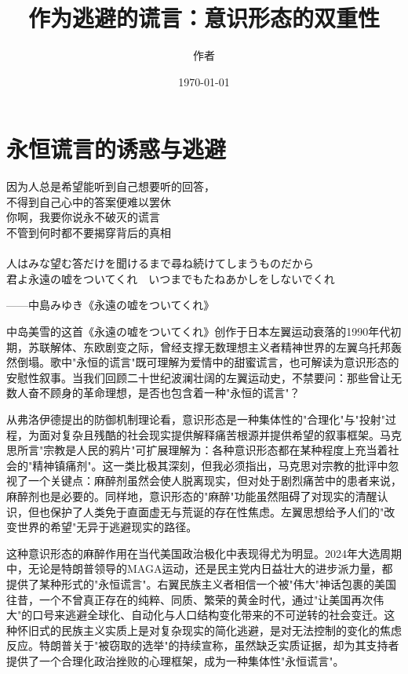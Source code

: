 \documentclass{article}
\title{作为逃避的谎言：意识形态的双重性}
\author{作者}
\date{\today}
\begin{document}
\maketitle

\section{永恒谎言的诱惑与逃避}

\epigraph{因为人总是希望能听到自己想要听的回答，\\
不得到自己心中的答案便难以罢休\\
你啊，我要你说永不破灭的谎言\\
不管到何时都不要揭穿背后的真相\\
\\
人はみな望む答だけを聞けるまで尋ね続けてしまうものだから\\
君よ永遠の嘘をついてくれ　いつまでもたねあかしをしないでくれ}{——中島みゆき《永遠の嘘をついてくれ》}

中岛美雪的这首《永遠の嘘をついてくれ》创作于日本左翼运动衰落的1990年代初期，苏联解体、东欧剧变之际，曾经支撑无数理想主义者精神世界的左翼乌托邦轰然倒塌。歌中"永恒的谎言"既可理解为爱情中的甜蜜谎言，也可解读为意识形态的安慰性叙事。当我们回顾二十世纪波澜壮阔的左翼运动史，不禁要问：那些曾让无数人奋不顾身的革命理想，是否也包含着一种"永恒的谎言"？

从弗洛伊德提出的防御机制理论看，意识形态是一种集体性的"合理化"与"投射"过程，为面对复杂且残酷的社会现实提供解释痛苦根源并提供希望的叙事框架。马克思所言"宗教是人民的鸦片"可扩展理解为：各种意识形态都在某种程度上充当着社会的"精神镇痛剂"。这一类比极其深刻，但我必须指出，马克思对宗教的批评中忽视了一个关键点：麻醉剂虽然会使人脱离现实，但对处于剧烈痛苦中的患者来说，麻醉剂也是必要的。同样地，意识形态的"麻醉"功能虽然阻碍了对现实的清醒认识，但也保护了人类免于直面虚无与荒诞的存在性焦虑。左翼思想给予人们的"改变世界的希望"无异于逃避现实的路径。

这种意识形态的麻醉作用在当代美国政治极化中表现得尤为明显。2024年大选周期中，无论是特朗普领导的MAGA运动，还是民主党内日益壮大的进步派力量，都提供了某种形式的"永恒谎言"。右翼民族主义者相信一个被"伟大"神话包裹的美国往昔，一个不曾真正存在的纯粹、同质、繁荣的黄金时代，通过"让美国再次伟大"的口号来逃避全球化、自动化与人口结构变化带来的不可逆转的社会变迁。这种怀旧式的民族主义实质上是对复杂现实的简化逃避，是对无法控制的变化的焦虑反应。特朗普关于"被窃取的选举"的持续宣称，虽然缺乏实质证据，却为其支持者提供了一个合理化政治挫败的心理框架，成为一种集体性"永恒谎言"。
\end{document}
